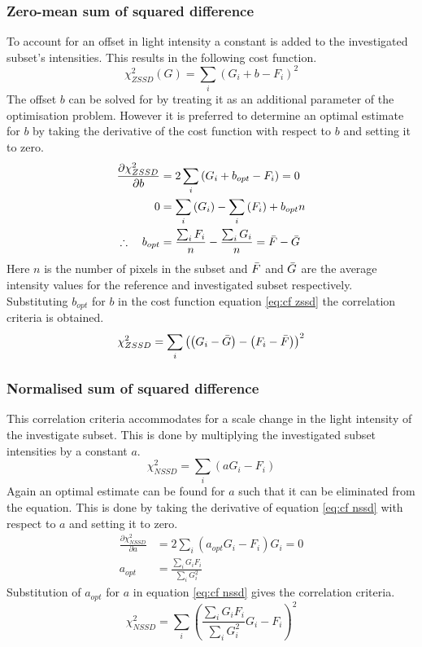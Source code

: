 \subsubsection{Zero-mean sum of squared difference}
To account for an offset in light intensity a constant is added to the investigated subset's intensities. This results in the following cost function.
\begin{equation}
\label{eq:cf zssd}
\chi_{ZSSD}^2 (G) = \sum_{i} \left( G_i +b -F_i \right) ^2
\end{equation}
The offset $b$ can be solved for by treating it as an additional parameter of the optimisation problem. However it is preferred to determine an optimal estimate for $b$ by taking the derivative of the cost function with respect to $b$ and setting it to zero.
\begin{align}
\frac{\partial \chi_{ZSSD}^2}{\partial b} &= 2 \sum_i \left( G_i + b_{opt} - F_i \right) = 0 \\
0 &= \sum_i \left( G_i \right) - \sum_i \left( F_i \right) +b_{opt}n \\
\therefore \quad b_{opt} &= \frac{\sum_i F_i}{n} - \frac{\sum_i G_i}{n} = \bar{F}-\bar{G}
\end{align}
Here $n$ is the number of pixels in the subset and $\bar{F}$ and $\bar{G}$  are the average intensity values for the reference and investigated subset respectively. Substituting $b_{opt}$ for $b$ in the cost function equation \ref{eq:cf zssd} the correlation criteria is obtained.
\begin{equation}
\chi_{ZSSD}^2 = \sum_{i} \left( \left( G_i - \bar{G} \right) - \left( F_i - \bar{F} \right) \right) ^2
\end{equation}

\subsubsection{Normalised sum of squared difference}
This correlation criteria accommodates for a scale change in the light intensity of the investigate subset. This is done by multiplying the investigated subset intensities by a constant $a$.
\begin{equation}
\label{eq:cf nssd}
\chi_{NSSD}^2 = \sum_i \left( a G_i - F_i\right)
\end{equation}
Again an optimal estimate can be found for $a$ such that it can be eliminated from the equation. This is done by taking the derivative of equation \ref{eq:cf nssd} with respect to $a$ and setting it to zero.
\begin{align}
\frac{\partial \chi_{NSSD}^2}{\partial a} &= 2 \sum_i \left( a_{opt} G_i - F_i \right) G_i = 0\\
a_{opt} &= \frac{\sum_i G_i F_i}{\sum_i G_i^2}
\end{align}
Substitution of $a_{opt}$ for $a$ in equation \ref{eq:cf nssd} gives the correlation criteria.
\begin{equation}
	\chi_{NSSD}^2 = \sum_i \left( \frac{\sum_i G_i F_i}{\sum_i G_i^2} G_i - F_i \right) ^2
\end{equation}

